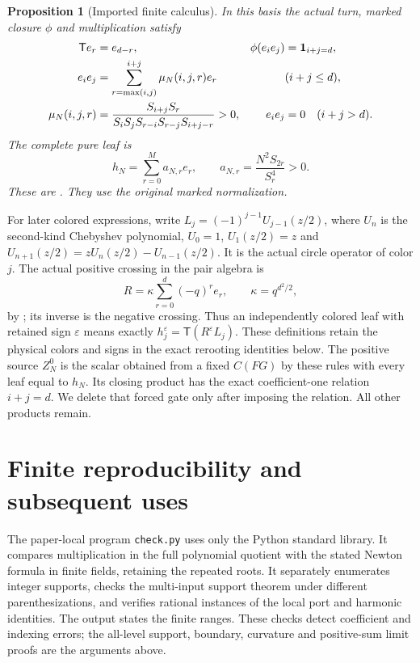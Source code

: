 \documentclass[11pt]{article}
\numberwithin{equation}{section}
\newtheorem{proposition}[theorem]{Proposition}
\theoremstyle{definition}\newtheorem{definition}[theorem]{Definition}
\theoremstyle{remark}\newtheorem{remark}[theorem]{Remark}
\newcommand{\T}{\mathsf T}
\newcommand{\eps}{\varepsilon}
\begin{document}
\begin{proposition}[Imported finite calculus]\label{st:imports}
In this basis the actual turn, marked closure $\phi$ and
multiplication satisfy
\begin{align}
 \T e_r&=e_{d-r},&
 \phi(e_i e_j)&=\mathbf1_{i+j=d},\label{st:pairing}\\
 e_i e_j&=\sum_{r=\max(i,j)}^{i+j}\mu_N(i,j,r)e_r
 &&(i+j\le d),\notag\\
 \mu_N(i,j,r)&=
 \frac{S_{i+j}S_r}{S_iS_jS_{r-i}S_{r-j}S_{i+j-r}}>0,
 & e_i e_j&=0\quad(i+j>d).\label{st:product}
\end{align}
The complete pure leaf is
\begin{equation}\label{st:leaf}
 h_N=\sum_{r=0}^M a_{N,r}e_r,\qquad
 a_{N,r}=\frac{N^2S_{2r}}{S_r^4}>0.
\end{equation}
These are \cite[Proposition 3.2, Theorem 3.3, Proposition 4.1 and
equation (4.3)]{Newton}. They use the original marked normalization.
\end{proposition}
For later colored expressions, write
$L_j=(-1)^{j-1}U_{j-1}(z/2)$, where $U_n$ is the
second-kind Chebyshev polynomial,
$U_0=1$, $U_1(z/2)=z$ and
$U_{n+1}(z/2)=zU_n(z/2)-U_{n-1}(z/2)$.
It is the actual circle operator of color $j$.
The actual positive crossing in the pair algebra is
\[
 R=\kappa\sum_{r=0}^d(-q)^r e_r,\qquad \kappa=q^{d^2/2},
\]
by \cite[equation (4.8)]{Newton}; its inverse is the
negative crossing. Thus an independently colored
leaf with retained sign $\eps$ means exactly
$h_j^\eps=\T(R^\eps L_j)$. These definitions retain
the physical colors and signs in the exact rerooting identities below.
The positive source $Z_N^0$ is the scalar obtained from a fixed
$C(FG)$ by these rules with every leaf equal to $h_N$.
Its closing product has the exact coefficient-one relation
$i+j=d$. We delete that forced gate only after imposing the
relation. All other products remain.





\section{Finite reproducibility and subsequent uses}
The paper-local program \texttt{check.py} uses only the Python
standard library. It compares multiplication in the full polynomial
quotient with the stated Newton formula in finite fields, retaining
the repeated roots. It separately enumerates integer supports,
checks the multi-input support theorem under different
parenthesizations, and verifies rational instances of the local
port and harmonic identities. The output states the finite ranges.
These checks detect coefficient and indexing errors; the all-level
support, boundary, curvature and positive-sum limit proofs are the
arguments above.
\end{document}
